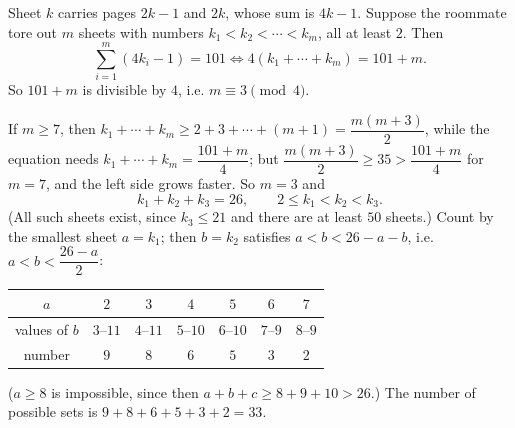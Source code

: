 Sheet $k$ carries pages $2k-1$ and $2k$, whose sum is $4k-1$. Suppose the roommate tore out $m$ sheets with numbers $k_1<k_2<\cdots<k_m$, all at least $2$. Then
\[\sum_{i=1}^{m}(4k_i-1)=101\iff4(k_1+\cdots+k_m)=101+m.\]
So $101+m$ is divisible by $4$, i.e. $m\equiv3\pmod4$.

If $m\ge7$, then $k_1+\cdots+k_m\ge2+3+\cdots+(m+1)=\dfrac{m(m+3)}{2}$, while the equation needs $k_1+\cdots+k_m=\dfrac{101+m}{4}$; but $\dfrac{m(m+3)}{2}\ge35>\dfrac{101+m}{4}$ for $m=7$, and the left side grows faster. So $m=3$ and
\[k_1+k_2+k_3=26,\qquad2\le k_1<k_2<k_3.\]
(All such sheets exist, since $k_3\le21$ and there are at least $50$ sheets.) Count by the smallest sheet $a=k_1$; then $b=k_2$ satisfies $a<b<26-a-b$, i.e. $a<b<\dfrac{26-a}{2}$:
\begin{center}
\begin{tabular}{c|cccccc}
$a$ & $2$ & $3$ & $4$ & $5$ & $6$ & $7$\\\hline
values of $b$ & $3$--$11$ & $4$--$11$ & $5$--$10$ & $6$--$10$ & $7$--$9$ & $8$--$9$\\
number & $9$ & $8$ & $6$ & $5$ & $3$ & $2$
\end{tabular}
\end{center}
($a\ge8$ is impossible, since then $a+b+c\ge8+9+10>26$.) The number of possible sets is $9+8+6+5+3+2=\boxed{33}$.
